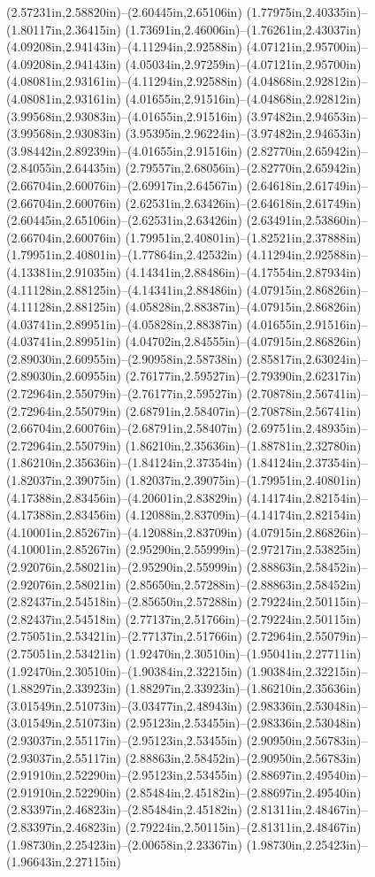 (2.57231in,2.58820in)--(2.60445in,2.65106in) (1.77975in,2.40335in)--(1.80117in,2.36415in) (1.73691in,2.46006in)--(1.76261in,2.43037in) (4.09208in,2.94143in)--(4.11294in,2.92588in) (4.07121in,2.95700in)--(4.09208in,2.94143in) (4.05034in,2.97259in)--(4.07121in,2.95700in) (4.08081in,2.93161in)--(4.11294in,2.92588in) (4.04868in,2.92812in)--(4.08081in,2.93161in) (4.01655in,2.91516in)--(4.04868in,2.92812in) (3.99568in,2.93083in)--(4.01655in,2.91516in) (3.97482in,2.94653in)--(3.99568in,2.93083in) (3.95395in,2.96224in)--(3.97482in,2.94653in) (3.98442in,2.89239in)--(4.01655in,2.91516in) (2.82770in,2.65942in)--(2.84055in,2.64435in) (2.79557in,2.68056in)--(2.82770in,2.65942in) (2.66704in,2.60076in)--(2.69917in,2.64567in) (2.64618in,2.61749in)--(2.66704in,2.60076in) (2.62531in,2.63426in)--(2.64618in,2.61749in) (2.60445in,2.65106in)--(2.62531in,2.63426in) (2.63491in,2.53860in)--(2.66704in,2.60076in) (1.79951in,2.40801in)--(1.82521in,2.37888in) (1.79951in,2.40801in)--(1.77864in,2.42532in) (4.11294in,2.92588in)--(4.13381in,2.91035in) (4.14341in,2.88486in)--(4.17554in,2.87934in) (4.11128in,2.88125in)--(4.14341in,2.88486in) (4.07915in,2.86826in)--(4.11128in,2.88125in) (4.05828in,2.88387in)--(4.07915in,2.86826in) (4.03741in,2.89951in)--(4.05828in,2.88387in) (4.01655in,2.91516in)--(4.03741in,2.89951in) (4.04702in,2.84555in)--(4.07915in,2.86826in) (2.89030in,2.60955in)--(2.90958in,2.58738in) (2.85817in,2.63024in)--(2.89030in,2.60955in) (2.76177in,2.59527in)--(2.79390in,2.62317in) (2.72964in,2.55079in)--(2.76177in,2.59527in) (2.70878in,2.56741in)--(2.72964in,2.55079in) (2.68791in,2.58407in)--(2.70878in,2.56741in) (2.66704in,2.60076in)--(2.68791in,2.58407in) (2.69751in,2.48935in)--(2.72964in,2.55079in) (1.86210in,2.35636in)--(1.88781in,2.32780in) (1.86210in,2.35636in)--(1.84124in,2.37354in) (1.84124in,2.37354in)--(1.82037in,2.39075in) (1.82037in,2.39075in)--(1.79951in,2.40801in) (4.17388in,2.83456in)--(4.20601in,2.83829in) (4.14174in,2.82154in)--(4.17388in,2.83456in) (4.12088in,2.83709in)--(4.14174in,2.82154in) (4.10001in,2.85267in)--(4.12088in,2.83709in) (4.07915in,2.86826in)--(4.10001in,2.85267in) (2.95290in,2.55999in)--(2.97217in,2.53825in) (2.92076in,2.58021in)--(2.95290in,2.55999in) (2.88863in,2.58452in)--(2.92076in,2.58021in) (2.85650in,2.57288in)--(2.88863in,2.58452in) (2.82437in,2.54518in)--(2.85650in,2.57288in) (2.79224in,2.50115in)--(2.82437in,2.54518in) (2.77137in,2.51766in)--(2.79224in,2.50115in) (2.75051in,2.53421in)--(2.77137in,2.51766in) (2.72964in,2.55079in)--(2.75051in,2.53421in) (1.92470in,2.30510in)--(1.95041in,2.27711in) (1.92470in,2.30510in)--(1.90384in,2.32215in) (1.90384in,2.32215in)--(1.88297in,2.33923in) (1.88297in,2.33923in)--(1.86210in,2.35636in) (3.01549in,2.51073in)--(3.03477in,2.48943in) (2.98336in,2.53048in)--(3.01549in,2.51073in) (2.95123in,2.53455in)--(2.98336in,2.53048in) (2.93037in,2.55117in)--(2.95123in,2.53455in) (2.90950in,2.56783in)--(2.93037in,2.55117in) (2.88863in,2.58452in)--(2.90950in,2.56783in) (2.91910in,2.52290in)--(2.95123in,2.53455in) (2.88697in,2.49540in)--(2.91910in,2.52290in) (2.85484in,2.45182in)--(2.88697in,2.49540in) (2.83397in,2.46823in)--(2.85484in,2.45182in) (2.81311in,2.48467in)--(2.83397in,2.46823in) (2.79224in,2.50115in)--(2.81311in,2.48467in) (1.98730in,2.25423in)--(2.00658in,2.23367in) (1.98730in,2.25423in)--(1.96643in,2.27115in) 